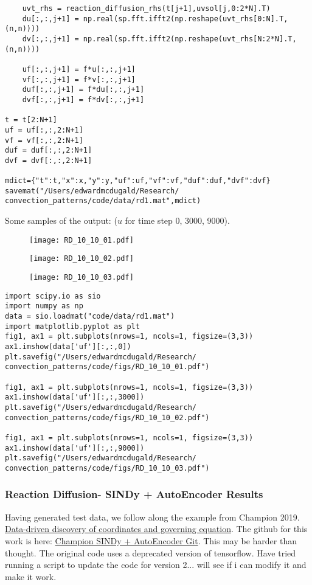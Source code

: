 \documentclass[12pt]{article}
\begin{document}
\begin{verbatim}
    uvt_rhs = reaction_diffusion_rhs(t[j+1],uvsol[j,0:2*N].T)
    du[:,:,j+1] = np.real(sp.fft.ifft2(np.reshape(uvt_rhs[0:N].T,(n,n))))
    dv[:,:,j+1] = np.real(sp.fft.ifft2(np.reshape(uvt_rhs[N:2*N].T,(n,n))))

    uf[:,:,j+1] = f*u[:,:,j+1]
    vf[:,:,j+1] = f*v[:,:,j+1]
    duf[:,:,j+1] = f*du[:,:,j+1]
    dvf[:,:,j+1] = f*dv[:,:,j+1]

t = t[2:N+1]
uf = uf[:,:,2:N+1]
vf = vf[:,:,2:N+1]
duf = duf[:,:,2:N+1]
dvf = dvf[:,:,2:N+1]

mdict={"t":t,"x":x,"y":y,"uf":uf,"vf":vf,"duf":duf,"dvf":dvf}
savemat("/Users/edwardmcdugald/Research/
convection_patterns/code/data/rd1.mat",mdict)
\end{verbatim}
Some samples of the output: ($u$ for time step 0, 3000, 9000).
\begin{figure}
    \centering
    \texttt{[image: RD\_10\_10\_01.pdf]}
\end{figure}
\FloatBarrier
\begin{figure}
    \centering
    \texttt{[image: RD\_10\_10\_02.pdf]}
\end{figure}
\FloatBarrier
\begin{figure}
    \centering
    \texttt{[image: RD\_10\_10\_03.pdf]}
\end{figure}
\FloatBarrier
\begin{verbatim}
import scipy.io as sio
import numpy as np
data = sio.loadmat("code/data/rd1.mat")
import matplotlib.pyplot as plt
fig1, ax1 = plt.subplots(nrows=1, ncols=1, figsize=(3,3))
ax1.imshow(data['uf'][:,:,0])
plt.savefig("/Users/edwardmcdugald/Research/
convection_patterns/code/figs/RD_10_10_01.pdf")

fig1, ax1 = plt.subplots(nrows=1, ncols=1, figsize=(3,3))
ax1.imshow(data['uf'][:,:,3000])
plt.savefig("/Users/edwardmcdugald/Research/
convection_patterns/code/figs/RD_10_10_02.pdf")

fig1, ax1 = plt.subplots(nrows=1, ncols=1, figsize=(3,3))
ax1.imshow(data['uf'][:,:,9000])
plt.savefig("/Users/edwardmcdugald/Research/
convection_patterns/code/figs/RD_10_10_03.pdf")
\end{verbatim}

\subsubsection{Reaction Diffusion- SINDy + AutoEncoder Results}
Having generated test data, we follow along the example from Champion 2019. \href{https://www.pnas.org/doi/pdf/10.1073/pnas.1906995116}{Data-driven discovery of coordinates and governing equation}.
The github for this work is here: \href{https://github.com/kpchamp/SindyAutoencoders}{Champion SINDy + AutoEncoder Git}.
This may be harder than thought. The original code uses a deprecated version of tensorflow.
Have tried running a script to update the code for version 2... will see if i can modify it and make it work.
\end{document}
